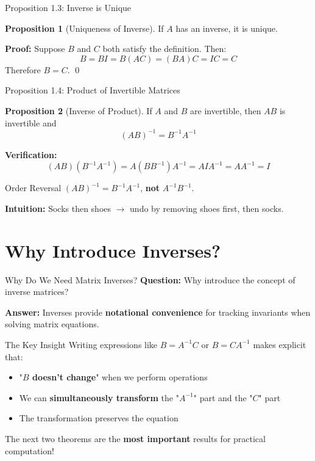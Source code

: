 \documentclass[10pt]{beamer}
\theoremstyle{definition}
\newtheorem{prop}{Proposition}[section]
\newcommand{\x}[1]{\alert{\textbf{#1}}}
\begin{document}
\begin{frame}{Proposition 1.3: Inverse is Unique}
\begin{prop}[Uniqueness of Inverse]
If $A$ has an inverse, it is unique.
\end{prop}

\vspace{0.3cm}
\textbf{Proof:} Suppose $B$ and $C$ both satisfy the definition. Then:
$$B = BI = B(AC) = (BA)C = IC = C$$
Therefore $B = C$. \qed
\end{frame}

\begin{frame}{Proposition 1.4: Product of Invertible Matrices}
\begin{prop}[Inverse of Product]
If $A$ and $B$ are invertible, then $AB$ is invertible and
$$(AB)^{-1} = B^{-1}A^{-1}$$
\end{prop}

\vspace{0.3cm}
\textbf{Verification:}
$$(AB)(B^{-1}A^{-1}) = A(BB^{-1})A^{-1} = AIA^{-1} = AA^{-1} = I$$

\vspace{0.5cm}
\begin{alertblock}{Order Reversal}
$(AB)^{-1} = B^{-1}A^{-1}$, \x{not} $A^{-1}B^{-1}$.

\textbf{Intuition:} Socks then shoes $\to$ undo by removing shoes first, then socks.
\end{alertblock}
\end{frame}


\section{Why Introduce Inverses?}

\begin{frame}{Why Do We Need Matrix Inverses?}
\textbf{Question:} Why introduce the concept of inverse matrices?

\vspace{0.5cm}
\textbf{Answer:} Inverses provide \x{notational convenience} for tracking invariants when solving matrix equations.

\vspace{0.5cm}
\begin{block}{The Key Insight}
Writing expressions like $B = A^{-1}C$ or $B = CA^{-1}$ makes explicit that:
\begin{itemize}
\item "\x{$B$ doesn't change}" when we perform operations
\item We can \x{simultaneously transform} the "$A^{-1}$" part and the "$C$" part
\item The transformation preserves the equation
\end{itemize}
\end{block}

\vspace{0.3cm}
The next two theorems are the \x{most important} results for practical computation!
\end{frame}
\end{document}
